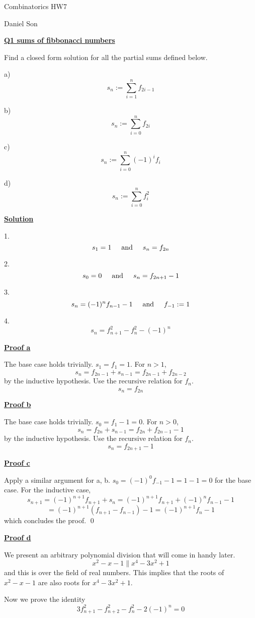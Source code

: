 \documentclass{article}
\newcommand{\new}[1]{
    \vspace{2mm}
    \noindent
    \textbf{
    \underline{#1}}
}
\newcommand{\textAnd}{
    {
        \hspace{5mm}
        \textrm{and}
        \hspace{5mm}
    }
}
\begin{document}
\begin{center}
\LARGE
Combinatorics HW7

\Large
Daniel Son
\end{center}

\normalsize 

\new{Q1 sums of fibbonacci numbers}

Find a closed form solution for all the partial sums defined below. 

a) \[
s_n := \sum_{i = 1}^n f_{2i - 1}    
\]

b) \[
s_n := \sum_{i = 0}^n f_{2i}    
\]

c) \[
s_n := \sum_{i = 0}^n (-1)^if_{i}    
\]

d) \[
s_n := \sum_{i = 0}^n f_{i}^2    
\]



\new{Solution}

1. 
\[
    s_1 = 1 \textAnd 
    s_n = f_{2n}
\]

2. \[
    s_0 = 0 \textAnd 
    s_n = f_{2n + 1} - 1 
\]

3. \[
    s_n = (-1)^{n} f_{n - 1} - 1  
    \textAnd f_{-1} := 1
\]

4. \[
    s_n = f_{n + 1}^2 - f_{n}^2 - (-1)^n
\]

\new{Proof a}
The base case holds trivially. $s_1 = f_1 = 1$. 
For $n > 1$, 
\[
    s_n  = f_{2n -1} + s_{n -1} = f_{2n - 1} + f_{2n - 2}
\]
by the inductive hypothesis. Use the recursive relation for $f_n$. 
\[
    \boxed{
    s_n = f_{2n}
    }
\]

\new{Proof b}
The base case holds trivially. $s_0 = f_1 - 1 = 0$. 
For $n > 0$, 
\[
    s_n  = f_{2n} + s_{n -1} = f_{2n} + f_{2n - 1} - 1
\]
by the inductive hypothesis. Use the recursive relation for $f_n$. 
\[
    \boxed{
    s_n = f_{2n + 1} - 1
    }
\]

\new{Proof c}
Apply a similar argument for a, b. $s_0 = (-1)^0f_{-1} - 1 =1-1= 0$ 
for the base case. For the inductive case, 
\[
    s_{n + 1}  =  (-1)^{n + 1}f_{n +1} + s_{n} = (-1)^{n + 1}f_{n+1} + (-1)^{n}f_{n - 1} - 1
\]
\[
    = (-1)^{n+1} (f_{n+1} - f_{n - 1}) - 1 = (-1)^{n+1} f_{n}  - 1
\]
which concludes the proof. 
\hfill \qed

\new{Proof d}
We present an arbitrary polynomial division that 
will come in handy later. 
\[
    x^2 - x - 1 
    \parallel
x^4 - 3x^2 + 1
\]
and this is over the field of real numbers. 
This implies that the roots of $x^2 - x -1$ are also 
roots for  $x^4 - 3x^2 + 1$. 

Now we prove the identity 
\begin{equation}
    3 f_{n+1}^2 - f_{n+2}^2 - f_n^2 - 2(-1)^n = 0
\end{equation}
\end{document}

